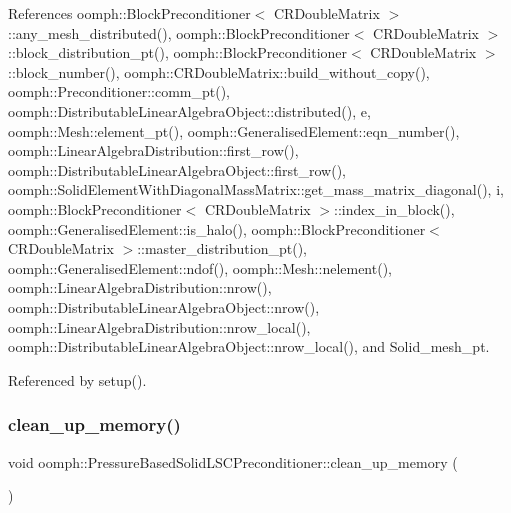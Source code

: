 References oomph\+::\+Block\+Preconditioner$<$ C\+R\+Double\+Matrix $>$\+::any\+\_\+mesh\+\_\+distributed(), oomph\+::\+Block\+Preconditioner$<$ C\+R\+Double\+Matrix $>$\+::block\+\_\+distribution\+\_\+pt(), oomph\+::\+Block\+Preconditioner$<$ C\+R\+Double\+Matrix $>$\+::block\+\_\+number(), oomph\+::\+C\+R\+Double\+Matrix\+::build\+\_\+without\+\_\+copy(), oomph\+::\+Preconditioner\+::comm\+\_\+pt(), oomph\+::\+Distributable\+Linear\+Algebra\+Object\+::distributed(), e, oomph\+::\+Mesh\+::element\+\_\+pt(), oomph\+::\+Generalised\+Element\+::eqn\+\_\+number(), oomph\+::\+Linear\+Algebra\+Distribution\+::first\+\_\+row(), oomph\+::\+Distributable\+Linear\+Algebra\+Object\+::first\+\_\+row(), oomph\+::\+Solid\+Element\+With\+Diagonal\+Mass\+Matrix\+::get\+\_\+mass\+\_\+matrix\+\_\+diagonal(), i, oomph\+::\+Block\+Preconditioner$<$ C\+R\+Double\+Matrix $>$\+::index\+\_\+in\+\_\+block(), oomph\+::\+Generalised\+Element\+::is\+\_\+halo(), oomph\+::\+Block\+Preconditioner$<$ C\+R\+Double\+Matrix $>$\+::master\+\_\+distribution\+\_\+pt(), oomph\+::\+Generalised\+Element\+::ndof(), oomph\+::\+Mesh\+::nelement(), oomph\+::\+Linear\+Algebra\+Distribution\+::nrow(), oomph\+::\+Distributable\+Linear\+Algebra\+Object\+::nrow(), oomph\+::\+Linear\+Algebra\+Distribution\+::nrow\+\_\+local(), oomph\+::\+Distributable\+Linear\+Algebra\+Object\+::nrow\+\_\+local(), and Solid\+\_\+mesh\+\_\+pt.



Referenced by setup().

\mbox{\label{classoomph_1_1PressureBasedSolidLSCPreconditioner_ad83eb2ddd12350bcba2cb8db074de2bd}} 
\subsubsection{\texorpdfstring{clean\+\_\+up\+\_\+memory()}{clean\_up\_memory()}}
{\footnotesize\ttfamily void oomph\+::\+Pressure\+Based\+Solid\+L\+S\+C\+Preconditioner\+::clean\+\_\+up\+\_\+memory (\begin{DoxyParamCaption}{ }\end{DoxyParamCaption})\hspace{0.3cm}{\ttfamily [virtual]}}



